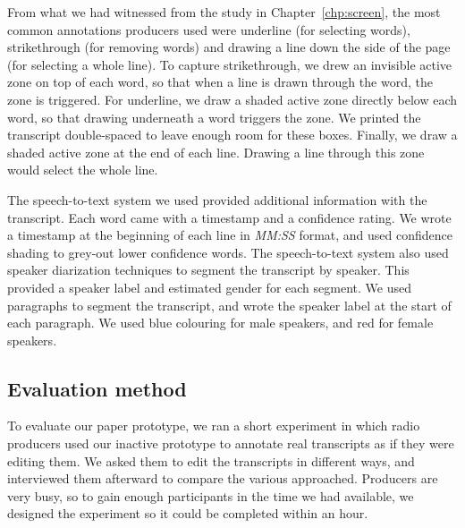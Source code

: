 From what we had witnessed from the study in Chapter~\ref{chp:screen}, the most common annotations producers used were
underline (for selecting words), strikethrough (for removing words) and drawing a line down the side of the page (for
selecting a whole line).  To capture strikethrough, we drew an invisible active zone on top of each word, so that when
a line is drawn through the word, the zone is triggered. For underline, we draw a shaded active zone directly below
each word, so that drawing underneath a word triggers the zone. We printed the transcript double-spaced to leave enough
room for these boxes. Finally, we draw a shaded active zone at the end of each line. Drawing a line through this zone
would select the whole line.

The speech-to-text system we used provided additional information with the transcript.  Each word came with a timestamp
and a confidence rating. We wrote a timestamp at the beginning of each line in \textit{MM:SS} format, and used
confidence shading to grey-out lower confidence words.  The speech-to-text system also used speaker diarization
techniques to segment the transcript by speaker. This provided a speaker label and estimated gender for each segment.
We used paragraphs to segment the transcript, and wrote the speaker label at the start of each paragraph. We used blue
colouring for male speakers, and red for female speakers.

\subsection{Evaluation method}




To evaluate our paper prototype, we ran a short experiment in which radio producers used our inactive prototype to
annotate real transcripts as if they were editing them.  We asked them to edit the transcripts in different ways, and
interviewed them afterward to compare the various approached. Producers are very busy, so to gain enough participants
in the time we had available, we designed the experiment so it could be completed within an hour.

